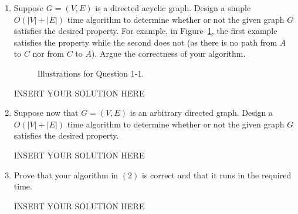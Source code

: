 \begin{enumerate}
\item Suppose $G = (V, E)$ is a directed acyclic graph. Design a simple $O(|V|+|E|)$ time algorithm to determine whether or not the given graph $G$ satisfies the desired property. For example, in Figure~\ref{fig:q1-1}, the first example satisfies the property while the second does not (as there is no path from $A$ to $C$ nor from $C$ to $A$).
Argue the correctness of your algorithm.



\begin{figure}[htb]
    \centering
    \caption{Illustrations for Question 1-1.}
    \label{fig:q1-1}
\end{figure}


\begin{solution}   INSERT YOUR SOLUTION HERE   \end{solution}

\item Suppose now that $G = (V, E)$ is an arbitrary directed graph. Design a $O(|V|+|E|)$ time algorithm to determine whether or not the given graph $G$ satisfies the desired property. 

\begin{solution}   INSERT YOUR SOLUTION HERE   \end{solution}


\item Prove that your algorithm in $(2)$ is correct and that it runs in the required time.
\begin{solution}   INSERT YOUR SOLUTION HERE   \end{solution}
\end{enumerate}


